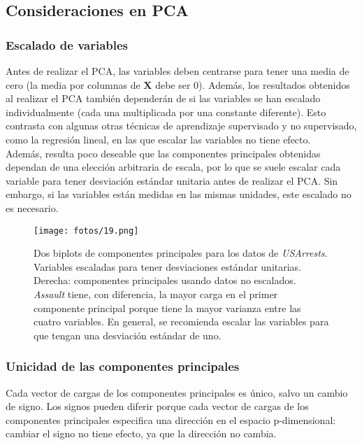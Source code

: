 \subsection{Consideraciones en PCA}

\subsubsection{Escalado de variables}

Antes de realizar el PCA, las variables deben centrarse para tener una media de cero (la media por columnas de $\mathbf{X}$ debe ser 0). Además, los resultados obtenidos al realizar el PCA también dependerán de si las variables se han escalado individualmente (cada una multiplicada por una constante diferente). Esto contrasta con algunas otras técnicas de aprendizaje supervisado y no supervisado, como la regresión lineal, en las que escalar las variables no tiene efecto. \\

Además, resulta poco deseable que las componentes principales obtenidas dependan de una elección arbitraria de escala, por lo que se suele escalar cada variable para tener desviación estándar unitaria antes de realizar el PCA. Sin embargo, si las variables están medidas en las mismas unidades, este escalado no es necesario.

\begin{figure}[h]
\centering
\texttt{[image: fotos/19.png]}
\caption{Dos biplots de componentes principales para los datos de \textit{USArrests}. Variables escaladas para tener desviaciones estándar unitarias. Derecha: componentes principales usando datos no escalados. \textit{Assault} tiene, con diferencia, la mayor carga en el primer componente principal porque tiene la mayor varianza entre las cuatro variables. En general, se recomienda escalar las variables para que tengan una desviación estándar de uno.}
\label{fig:10.3}
\end{figure}

\subsubsection{Unicidad de las componentes principales}

Cada vector de cargas de los componentes principales es único, salvo un cambio de signo. Los signos pueden diferir porque cada vector de cargas de los componentes principales especifica una dirección en el espacio p-dimensional: cambiar el signo no tiene efecto, ya que la dirección no cambia.